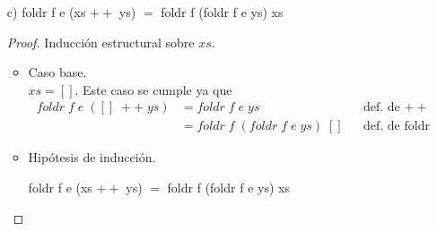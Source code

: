 \documentclass[letterpaper,11pt]{article}
\begin{document}
\begin{enumerate}
\begin{itemize}
\begin{proof}
\begin{itemize}
                donde la justificación de los pasos es la siguiente:
                \begin{enumerate}
                    \item Aplicamos la definición de reverse.
                    \item Aplicamos lo demostrado en el inciso c).
                    \item Aplicamos la definición de foldr en (foldr (flip f ) e [x]).
                    \item Aplicamos la definición de foldr en (foldr (flip f ) e [])).
                    \item Aplicamos la definición de flip.
                    \item Aplicamos la hipótesis de inducción.
                    \item Aplicamos la definición de foldl.
                \end{enumerate}
            \end{itemize}
        \end{proof}

        \item[c)] foldr f e (xs $++$ ys) $=$ foldr f (foldr f e ys) xs
        \begin{proof}
            Inducción estructural sobre $xs$.
            \begin{itemize}
                \item Caso base. \\ 
                $xs = []$. Este caso se cumple ya que 
                \begin{align*}
                    foldr \; f \; e \; ([] \; ++ \; ys)
                    &= foldr \; f \; e \; ys
                    && \text{def. de $++$} \\ 
                    &= foldr \; f \; (foldr \; f \; e \; ys) \; []
                    && \text{def. de foldr}
                \end{align*}

                \item Hipótesis de inducción.
                \begin{center}
                    foldr f e (xs $++$ ys) $=$ foldr f (foldr f e ys) xs
                \end{center}


\end{itemize}
\end{proof}
\end{itemize}
\end{enumerate}
\end{document}
